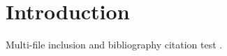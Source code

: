 \section{Introduction}
Multi-file inclusion and bibliography citation test \cite{knuth1984texbook}.
